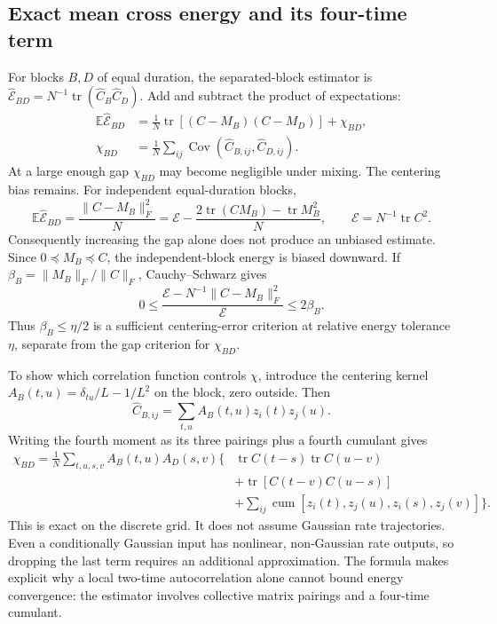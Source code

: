 \subsection{Exact mean cross energy and its four-time term}
For blocks $B,D$ of equal duration, the separated-block estimator is
$\widehat{\mathcal E}_{BD}=N^{-1}\operatorname{tr}
(\widehat C_B\widehat C_D)$. Add and subtract the product of expectations:
\begin{align*}
 \mathbb E\widehat{\mathcal E}_{BD}
 &=\frac1N\operatorname{tr}[(C-M_B)(C-M_D)]+\chi_{BD},\\
 \chi_{BD}&=\frac1N\sum_{ij}
       \operatorname{Cov}(\widehat C_{B,ij},\widehat C_{D,ij}).
\end{align*}
At a large enough gap $\chi_{BD}$ may become negligible under mixing. The
centering bias remains. For independent equal-duration blocks,
\[
 \mathbb E\widehat{\mathcal E}_{BD}
 =\frac{\|C-M_B\|_F^2}{N}
 =\mathcal E-\frac{2\operatorname{tr}(CM_B)-\operatorname{tr}M_B^2}{N},
 \qquad\mathcal E=N^{-1}\operatorname{tr}C^2.
\]
Consequently increasing the gap alone does not produce an unbiased estimate.
Since $0\preceq M_B\preceq C$, the independent-block energy is biased downward.
If $\beta_B=\|M_B\|_F/\|C\|_F$, Cauchy--Schwarz gives
\[
 0\le\frac{\mathcal E-
       N^{-1}\|C-M_B\|_F^2}{\mathcal E}\le2\beta_B.
\]
Thus $\beta_B\le\eta/2$ is a sufficient centering-error criterion at relative
energy tolerance $\eta$, separate from the gap criterion for $\chi_{BD}$.

To show which correlation function controls $\chi$, introduce the centering
kernel $A_B(t,u)=\delta_{tu}/L-1/L^2$ on the block, zero outside. Then
\[
 \widehat C_{B,ij}=\sum_{t,u}A_B(t,u)z_i(t)z_j(u).
\]
Writing the fourth moment as its three pairings plus a fourth cumulant gives
\begin{align*}
 \chi_{BD}=\frac1N\sum_{t,u,s,v}A_B(t,u)A_D(s,v)
 \Big\{&\operatorname{tr}C(t-s)\operatorname{tr}C(u-v)\\
 &+\operatorname{tr}[C(t-v)C(u-s)]\\
 &+\sum_{ij}\operatorname{cum}[z_i(t),z_j(u),z_i(s),z_j(v)]\Big\}.
\end{align*}
This is exact on the discrete grid. It does not assume Gaussian rate
trajectories. Even a conditionally Gaussian input has nonlinear, non-Gaussian
rate outputs, so dropping the last term requires an additional approximation.
The formula makes explicit why a local two-time autocorrelation alone cannot
bound energy convergence: the estimator involves collective matrix pairings
and a four-time cumulant.

